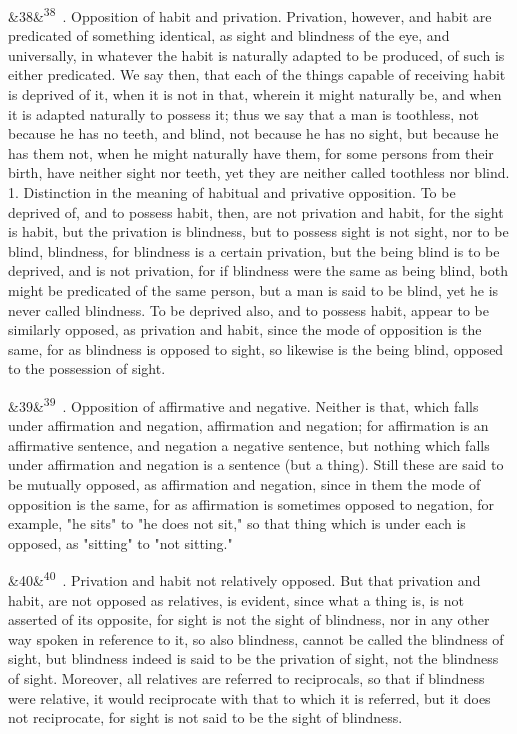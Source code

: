 \documentclass[12pt]{article}
\newcommand{\para}[1][]{\par\noindent\ifx&#1&\else\textsuperscript{\footnotesize #1}~\fi}
\begin{document}
\para[38] 3. Opposition of habit and privation. Privation, however, and habit are predicated of something identical, as sight and blindness of the eye, and universally, in whatever the habit is naturally adapted to be produced, of such is either predicated. We say then, that each of the things capable of receiving habit is deprived of it, when it is not in that, wherein it might naturally be, and when it is adapted naturally to possess it; thus we say that a man is toothless, not because he has no teeth, and blind, not because he has no sight, but because he has them not, when he might naturally have them, for some persons from their birth, have neither sight nor teeth, yet they are neither called toothless nor blind. 1. Distinction in the meaning of habitual and privative opposition. To be deprived of, and to possess habit, then, are not privation and habit, for the sight is habit, but the privation is blindness, but to possess sight is not sight, nor to be blind, blindness, for blindness is a certain privation, but the being blind is to be deprived, and is not privation, for if blindness were the same as being blind, both might be predicated of the same person, but a man is said to be blind, yet he is never called blindness. To be deprived also, and to possess habit, appear to be similarly opposed, as privation and habit, since the mode of opposition is the same, for as blindness is opposed to sight, so likewise is the being blind, opposed to the possession of sight.

\para[39] 4. Opposition of affirmative and negative. Neither is that, which falls under affirmation and negation, affirmation and negation; for affirmation is an affirmative sentence, and negation a negative sentence, but nothing which falls under affirmation and negation is a sentence (but a thing). Still these are said to be mutually opposed, as affirmation and negation, since in them the mode of opposition is the same, for as affirmation is sometimes opposed to negation, for example, "he sits" to "he does not sit," so that thing which is under each is opposed, as "sitting" to "not sitting."

\para[40] 5. Privation and habit not relatively opposed. But that privation and habit, are not opposed as relatives, is evident, since what a thing is, is not asserted of its opposite, for sight is not the sight of blindness, nor in any other way spoken in reference to it, so also blindness, cannot be called the blindness of sight, but blindness indeed is said to be the privation of sight, not the blindness of sight. Moreover, all relatives are referred to reciprocals, so that if blindness were relative, it would reciprocate with that to which it is referred, but it does not reciprocate, for sight is not said to be the sight of blindness.
\end{document}
